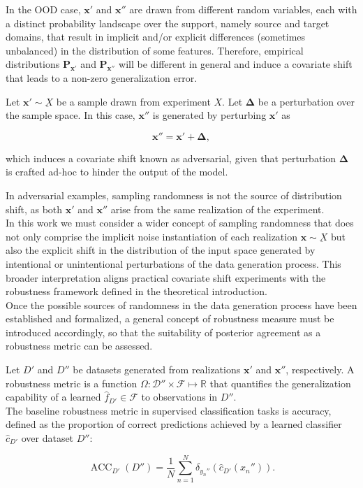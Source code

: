 In the OOD case, $\bm{x}'$ and $\bm{x}''$ are
drawn from different random variables, each with a distinct probability 
landscape over the support, namely source and target domains, that result 
in implicit and/or explicit differences (sometimes unbalanced) in the distribution of some features.
Therefore, empirical distributions $\mathbf{P}_{\bm{x}'}$ and $\mathbf{P}_{\bm{x}''}$ will
be different in general and induce a covariate shift that leads
to a non-zero generalization error.

\begin{definition}
    Let $\bm{x}' \sim \underbar{X}$ be a sample drawn from experiment
    $X$. Let $\bm{\Delta}$ be a perturbation over
    the sample space. In this case, $\bm{x}''$ is generated by perturbing $\bm{x}'$ as

    $$
    \bm{x}'' = \bm{x}' + \bm{\Delta},
    $$

    which induces a covariate shift known as adversarial, given that
    perturbation $\bm{\Delta}$ is crafted ad-hoc to hinder the 
    output of the model.
\end{definition}

In adversarial examples, sampling randomness is not the source of
distribution shift, as both $\bm{x}'$ and $\bm{x}''$ arise from
the same realization of the experiment. \\

In this work we must consider a wider concept of sampling 
randomness that does not only comprise the implicit
noise instantiation of each realization $\bm{x} \sim \underbar{X}$
but also the explicit shift in the distribution of the input space
generated by intentional or unintentional perturbations of the 
data generation process. This broader interpretation aligns practical
covariate shift experiments with the robustness framework
defined in the theoretical introduction.\\

Once the possible sources of randomness in the data 
generation process have been established and formalized, 
a general concept of robustness measure must be introduced 
accordingly, so that the suitability of posterior agreement
as a robustness metric can be assessed.

\begin{definition}
    Let $D'$ and $D''$ be datasets generated from realizations $\bm{x}'$ and $\bm{x}''$,
    respectively. 
    A robustness metric is a function $\Omega: \mathcal{D}'' \times \mathcal{F} \longmapsto \mathbb{R}$ 
    that quantifies the generalization
    capability of a learned $\hat{f}_{D'} \in \mathcal{F}$ to observations in $D''$. \\

    The baseline robustness metric in supervised classification tasks is
    accuracy, defined as the proportion of correct predictions 
    achieved by a learned classifier $\hat{c}_{D'}$ over 
    dataset $D''$:

    $$
    \operatorname{ACC}_{D'}(D'') = \frac{1}{N} \sum_{n=1}^N \delta_{y_n''} \left ( \hat{c}_{D'}(x_n'') \right ).
    $$

\end{definition}

